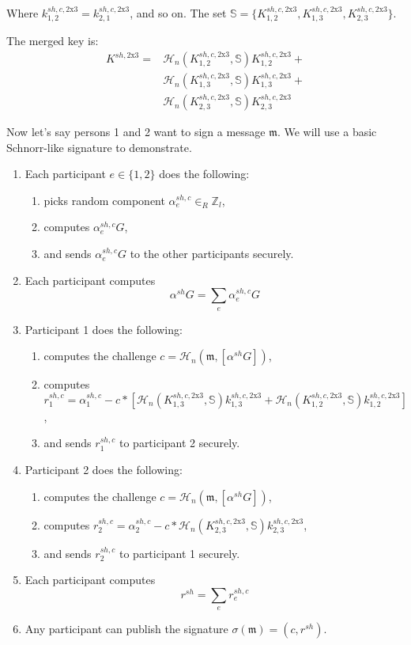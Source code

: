 Where $k^{sh,c,\textrm{2x3}}_{1,2} = k^{sh,c,\textrm{2x3}}_{2,1}$, and so on. The set $\mathbb{S} = \{ K^{sh,c,\textrm{2x3}}_{1,2}, K^{sh,c,\textrm{2x3}}_{1,3}, K^{sh,c,\textrm{2x3}}_{2,3}\}$.

The merged key is:
\begin{align*}
    K^{sh,\textrm{2x3}} = &\mathcal{H}_n(K^{sh,c,\textrm{2x3}}_{1,2},\mathbb{S}) K^{sh,c,\textrm{2x3}}_{1,2} + \\
                          &\mathcal{H}_n(K^{sh,c,\textrm{2x3}}_{1,3},\mathbb{S}) K^{sh,c,\textrm{2x3}}_{1,3} + \\
                          &\mathcal{H}_n(K^{sh,c,\textrm{2x3}}_{2,3},\mathbb{S}) K^{sh,c,\textrm{2x3}}_{2,3}
\end{align*}

Now let's say persons 1 and 2 want to sign a message $\mathfrak{m}$. We will use a basic Schnorr-like signature to demonstrate.

\begin{enumerate}
    \item Each participant $e \in \{1,2\}$ does the following:
    \begin{enumerate}
        \item picks random component $\alpha^{sh,c}_e \in_R \mathbb{Z}_l$,
        \item computes $\alpha^{sh,c}_e G$,
        \item and sends $\alpha^{sh,c}_e G$ to the other participants securely.
    \end{enumerate}
    \item Each participant computes 
    \[ \alpha^{sh} G = \sum_e \alpha^{sh,c}_e G \]
    \item Participant 1 does the following:
    \begin{enumerate}
        \item computes the challenge $c = \mathcal{H}_n(\mathfrak{m},[\alpha^{sh} G])$,
        \item computes $r^{sh,c}_1 = \alpha^{sh,c}_1 - c*[\mathcal{H}_n(K^{sh,c,\textrm{2x3}}_{1,3},\mathbb{S}) k^{sh,c,\textrm{2x3}}_{1,3} + \mathcal{H}_n(K^{sh,c,\textrm{2x3}}_{1,2},\mathbb{S}) k^{sh,c,\textrm{2x3}}_{1,2}]$,
        \item and sends $r^{sh,c}_1$ to participant 2 securely.
    \end{enumerate}
    \item Participant 2 does the following:
    \begin{enumerate}
        \item computes the challenge $c = \mathcal{H}_n(\mathfrak{m},[\alpha^{sh} G])$,
        \item computes $r^{sh,c}_2 = \alpha^{sh,c}_2 - c*\mathcal{H}_n(K^{sh,c,\textrm{2x3}}_{2,3},\mathbb{S}) k^{sh,c,\textrm{2x3}}_{2,3}$,
        \item and sends $r^{sh,c}_2$ to participant 1 securely.
    \end{enumerate}
    \item Each participant computes 
    \[ r^{sh} = \sum_e r^{sh,c}_e \]
    \item Any participant can publish the signature $\sigma(\mathfrak{m}) = (c,r^{sh})$.
\end{enumerate}


